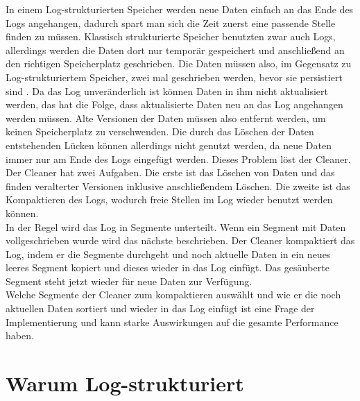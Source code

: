 \documentclass{class/thesis}
\begin{document}
\begin{thesis}
	In einem Log-strukturierten Speicher werden neue Daten einfach an das Ende des Logs angehangen, dadurch spart man sich die Zeit zuerst eine passende Stelle finden zu müssen. Klassisch strukturierte Speicher benutzten zwar auch Logs, allerdings werden die Daten dort nur temporär gespeichert und anschließend an den richtigen Speicherplatz geschrieben. Die Daten müssen also, im Gegensatz zu Log-strukturiertem Speicher, zwei mal geschrieben werden, bevor sie persistiert sind \cite{Rosenblum:1992}.
	Da das Log unveränderlich ist können Daten in ihm nicht aktualisiert werden, das hat die Folge, dass aktualisierte Daten neu an das Log angehangen werden müssen. Alte Versionen der Daten müssen also entfernt werden, um keinen Speicherplatz zu verschwenden. Die durch das Löschen der Daten entstehenden Lücken können allerdings nicht genutzt werden, da neue Daten immer nur am Ende des Logs eingefügt werden.
	Dieses Problem löst der Cleaner. \\
	Der Cleaner hat zwei Aufgaben. Die erste ist das Löschen von Daten und das finden veralterter Versionen inklusive anschließendem Löschen. Die zweite ist das Kompaktieren des Logs, wodurch freie Stellen im Log wieder benutzt werden können. \\
	In der Regel wird das Log in Segmente unterteilt. Wenn ein Segment mit Daten vollgeschrieben wurde wird das nächste beschrieben. Der Cleaner kompaktiert das Log, indem er die Segmente durchgeht und noch aktuelle Daten in ein neues leeres Segment kopiert und dieses wieder in das Log einfügt. Das gesäuberte Segment steht jetzt wieder für neue Daten zur Verfügung. \\
	Welche Segmente der Cleaner zum kompaktieren auswählt und wie er die noch aktuellen Daten sortiert und wieder in das Log einfügt ist eine Frage der Implementierung und kann starke Auswirkungen auf die gesamte Performance haben.
	
	
	
	\section{Warum Log-strukturiert}
	

\end{thesis}
\end{document}
